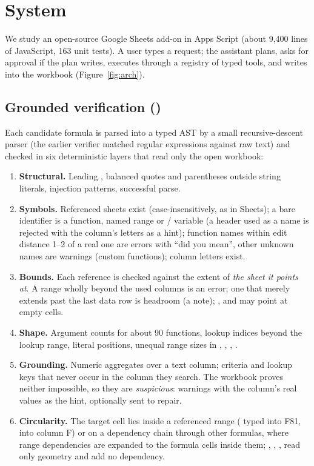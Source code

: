 \section{System}
\label{sec:system}

We study an open-source Google Sheets add-on in Apps Script (about 9{,}400 lines of JavaScript, 163 unit tests). A user types a request; the assistant plans, asks for approval if the plan writes, executes through a registry of typed tools, and writes into the workbook (Figure~\ref{fig:arch}).



\subsection{Grounded verification (\gc)}
\label{sec:gc}
Each candidate formula is parsed into a typed AST by a small recursive-descent parser (the earlier verifier matched regular expressions against raw text) and checked in six deterministic layers that read only the open workbook:
\begin{enumerate}\itemsep0pt
\item \textbf{Structural.} Leading \code{=}, balanced quotes and parentheses outside string literals, injection patterns, successful parse.
\item \textbf{Symbols.} Referenced sheets exist (case-insensitively, as in Sheets); a bare identifier is a function, named range or / variable (a header used as a name is rejected with the column's letters as a hint); function names within edit distance 1--2 of a real one are errors with ``did you mean'', other unknown names are warnings (custom functions);  column letters exist.
\item \textbf{Bounds.} Each reference is checked against the extent of \emph{the sheet it points at}. A range wholly beyond the used columns is an error; one that merely extends past the last data row is headroom (a note); ,  and  may point at empty cells.
\item \textbf{Shape.} Argument counts for about 90 functions, lookup indices beyond the lookup range, literal  positions, unequal range sizes in , , , .
\item \textbf{Grounding.} Numeric aggregates over a text column; criteria and lookup keys that never occur in the column they search. The workbook proves neither impossible, so they are \emph{suspicious}: warnings with the column's real values as the hint, optionally sent to repair.
\item \textbf{Circularity.} The target cell lies inside a referenced range ( typed into F81,  into column F) or on a dependency chain through other formulas, where range dependencies are expanded to the formula cells inside them; , , ,  read only geometry and add no dependency.
\end{enumerate}
